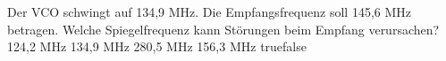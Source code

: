     {Der VCO schwingt auf 134,9 MHz. Die Empfangsfrequenz soll 145,6 MHz betragen. Welche Spiegelfrequenz kann Störungen beim Empfang verursachen?}
    {124,2 MHz}
    {134,9 MHz}
    {280,5 MHz }
    {156,3 MHz}
    {true}{false}